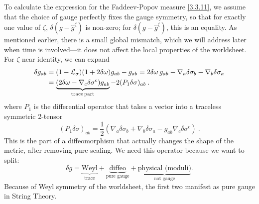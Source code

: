 To calculate the expression for the Faddeev-Popov measure \eqref{3.3.11}, we assume that the choice of gauge perfectly fixes the gauge symmetry, so that for exactly one value of $\zeta$, $\delta(g-\hat{g} ^\zeta)$ is non-zero; for $\delta(g-\hat{g}^ \zeta)$, this is an equality.    
As mentioned earlier, there is a small global mismatch, which we will address later when time is involved—it does not affect the local properties of the worldsheet. For $\zeta$ near identity, we can expand    
\begin{align}
	\delta g_{a b} &=(1-\mathcal{L}_{\sigma})(1+2\delta\omega)g_{ab}-g_{ab}=2 \delta \omega \,g_{a b}-\nabla_{a} \delta \sigma_{b}-\nabla_{b} \delta \sigma_{a} \nonumber \\
	&=\underbrace{(2 \delta \omega-\nabla_{c} \delta \sigma^{c}) g_{a b}}_{\rm trace \,part}-2(P_{1} \delta \sigma)_{a b} \:.
	\label{3.3.16}
\end{align}
where $P_1$ is the differential operator that takes a vector into a traceless symmetric 2-tensor   
\begin{equation}
	(P_{1} \delta \sigma)_{a b}=\frac{1}{2}(\nabla_{a} \delta \sigma_{b}+\nabla_{b} \delta \sigma_{a}-g_{a b} \nabla_{c} \delta \sigma^{c}) \:.
	\label{3.3.17}
\end{equation}
This is the part of a diffeomorphism that actually changes the shape of the metric, after removing pure scaling. We need this operator because we want to split:
\begin{equation}
	\delta g = \underbrace{\text{Weyl}}_{\text{trace}}+\underbrace{\text{diffeo}}_{\text{pure gauge}} +\underbrace{\text{physical (moduli)}}_{\text{not gauge}}.
\end{equation}
Because of Weyl symmetry of the worldsheet, the first two manifest as pure gauge in String Theory.
